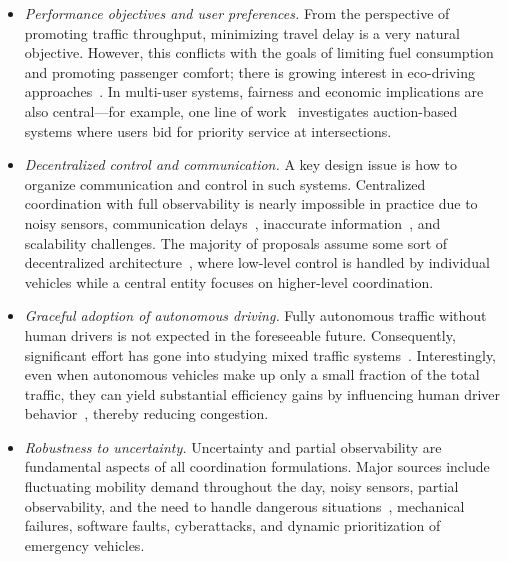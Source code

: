 \documentclass{report}
\theoremstyle{definition}
\theoremstyle{plain}
\begin{document}
\begin{itemize}

  \item \emph{Performance objectives and user preferences.} From the perspective of
        promoting traffic throughput, minimizing travel delay is a very natural
        objective. However, this conflicts with the goals of limiting fuel
        consumption and promoting passenger comfort; there is growing interest
        in eco-driving approaches~\cite{hadjigeorgiouEnergyConsumptionOptimization2025}.
        In multi-user systems, fairness and economic implications are also
        central---for example, one line of work~\cite{reyOnlineIncentiveCompatibleMechanisms2020,sayinInformationDrivenAutonomousIntersection2019} investigates
        auction-based systems where users bid for priority service at
        intersections.
  
  \item \emph{Decentralized control and communication.} A key design issue is
        how to organize communication and control in such systems.
        Centralized coordination with full observability is nearly impossible in
        practice due to noisy sensors, communication delays~\cite{wangAssessingImpactCommunication2024},
        inaccurate information~\cite{vitaleAutonomousIntersectionCrossing2022}, and scalability challenges. The majority
        of proposals assume some sort of decentralized architecture~\cite{yangAutonomousDrivingV2X2022},
        where low-level control is handled by individual vehicles while a
        central entity focuses on higher-level coordination.

  \item \emph{Graceful adoption of autonomous driving.} Fully autonomous traffic without
        human drivers is not expected in the foreseeable future. Consequently,
        significant effort has gone into studying mixed traffic
        systems~\cite{liSurveyUrbanTraffic2023}.
        Interestingly, even when autonomous vehicles make up only a small
        fraction of the total traffic, they can yield substantial efficiency
        gains by influencing human driver
        behavior~\cite{wangLearningControlCoordinate2025}, thereby reducing
        congestion.

  \item \emph{Robustness to uncertainty.}
        Uncertainty and partial observability are fundamental aspects of all
        coordination formulations.
        Major sources include fluctuating mobility demand throughout the day,
        noisy sensors, partial observability, and the need to handle dangerous
        situations~\cite{yuUncertaintyAwareSafetyCriticalDecision2025},
        mechanical failures, software faults, cyberattacks, and dynamic
        prioritization of emergency vehicles.
\end{itemize}
\end{document}
